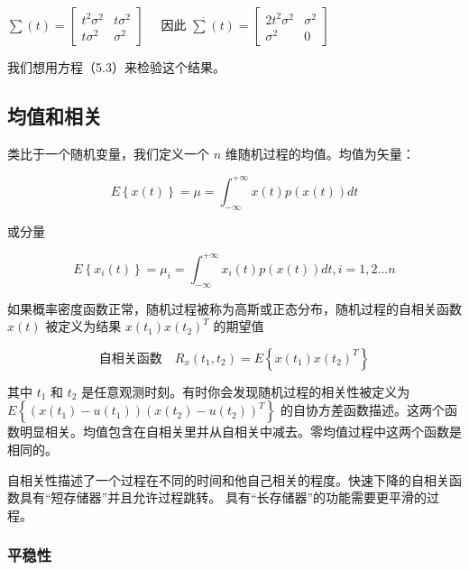 	   $ \sum(t)=\begin{bmatrix} t^{2}\sigma^{2} & t\sigma^{2} \\ t\sigma^{2} & \sigma^{2} \end{bmatrix} \quad $  因此  $ \dot{\sum}(t)=\begin{bmatrix} 2t^{2}\sigma^{2} & \sigma^{2} \\ \sigma^{2} & 0 \end{bmatrix} \quad  $ 
	   
	   我们想用方程（5.3）来检验这个结果。
	   
	    \subsection {均值和相关}  
	    
	   类比于一个随机变量，我们定义一个 $  n $ 维随机过程的均值。均值为矢量： 
	   
	     \begin{equation}\label{5.6}
	    E\left\lbrace  x(t)\right\rbrace  =\mu=\int_{-\infty}^{+\infty}x(t)p(x(t))dt
	    \end{equation}
	    
	    
	    或分量
	    
	      \begin{equation}\label{5.7}
	     E\left\lbrace  x_{i}(t)\right\rbrace  =\mu_{i}=\int_{-\infty}^{+\infty}x_{i}(t)p(x(t))dt,i=1,2...n
	     \end{equation}
	     
	     
	     如果概率密度函数正常，随机过程被称为高斯或正态分布，随机过程的自相关函数 $ x(t) $ 被定义为结果 $ x(t_{1})x(t_{2})^{T} $ 的期望值
	     
	    \begin{equation}\label{5.8}
	   自相关函数 \quad R_{x}(t_{1},t_{2}) =E\left\lbrace x(t_{1})x(t_{2})^{T}\right\rbrace 
	     \end{equation}
	     
	     其中 $ t_{1} $ 和 $ t_{2} $ 是任意观测时刻。有时你会发现随机过程的相关性被定义为  $ E\left\lbrace(x(t_{1})-u(t_{1}))(x(t_{2})-u(t_{2}))^{T} \right\rbrace  $ 的自协方差函数描述。这两个函数明显相关。均值包含在自相关里并从自相关中减去。零均值过程中这两个函数是相同的。
	     
	     
	     自相关性描述了一个过程在不同的时间和他自己相关的程度。快速下降的自相关函数具有“短存储器”并且允许过程跳转。 具有“长存储器”的功能需要更平滑的过程。
	     
	      \subsubsection { 平稳性} 
	     
